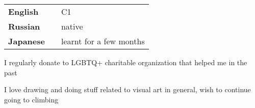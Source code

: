 \documentclass[9pt]{template/developercv}
\begin{document}
\begin{minipage}[t]{0.3\textwidth}
	\vspace{-2\baselineskip}


	\begin{tabular}{lp{}l}
		\textbf{English} & & C1\\
		\textbf{Russian} & & native\\
		\textbf{Japanese} & & learnt for a few months
	\end{tabular}
\end{minipage}
\hfill
\begin{minipage}[t]{0.3\textwidth}
	\vspace{-2\baselineskip}


	I regularly donate to LGBTQ+ charitable organization that helped me in the past
\end{minipage}
\hfill
\begin{minipage}[t]{0.3\textwidth}
	\vspace{-2\baselineskip}


	I love drawing and doing stuff related to visual art in general, wish to continue going to climbing
\end{minipage}
\end{document}
